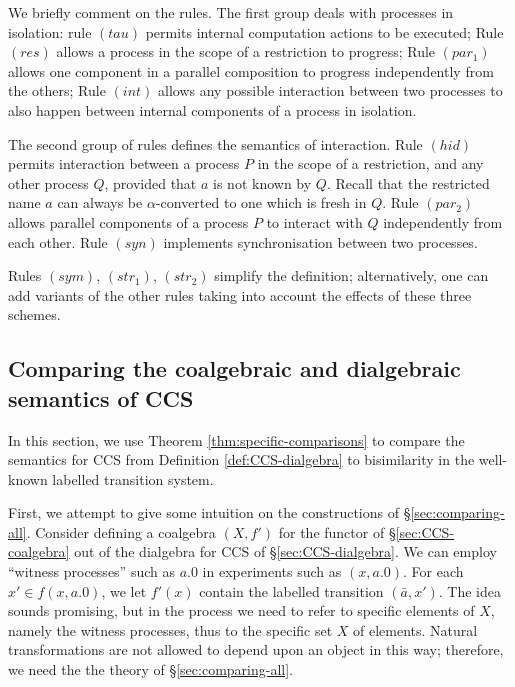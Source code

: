 \documentclass[orivec]{llncs}
\begin{document}
We briefly comment on the rules. The first group deals with processes in isolation: rule $(tau)$ permits internal computation actions to be executed; Rule $(res)$ allows a process in the scope of a restriction to progress; Rule $(par_1)$ allows one component in a parallel composition to progress independently from the others;  Rule $(int)$ allows any possible interaction between two processes to also happen between internal components of a process in isolation.

The second group of rules defines the semantics of interaction. Rule $(hid)$ permits interaction between a process $P$ in the scope of a restriction, and any other process $Q$, provided that $a$ is not known by $Q$. Recall that the restricted name $a$ can always be $\alpha$-converted to one which is fresh in $Q$. Rule $(par_2)$ allows parallel components of a process $P$ to interact with $Q$ independently from each other. Rule $(syn)$ implements synchronisation between two processes.

Rules $(sym)$, $(str_1)$, $(str_2)$ simplify the definition; alternatively, one can add variants of the other rules taking into account the effects of these three schemes.





\subsection{Comparing the coalgebraic and dialgebraic semantics of CCS}
\label{sec:ccs-comparison}

In this section, we use Theorem \ref{thm:specific-comparisons} to compare the semantics for CCS from Definition \ref{def:CCS-dialgebra} to bisimilarity in the well-known labelled transition system. 

First, we attempt to give some intuition on the constructions of \S\ref{sec:comparing-all}. Consider defining a coalgebra $(X,f')$ for the functor of \S \ref{sec:CCS-coalgebra} out of the dialgebra for CCS of \S \ref{sec:CCS-dialgebra}. We can employ ``witness processes'' such as $a.0$ in experiments such as $(x,a.0)$. For each  $x' \in f(x,a.0)$, we let $f'(x)$ contain the labelled transition $(\bar a,x')$. The idea sounds promising, but in the process we need to refer to specific elements of $X$, namely the witness processes, thus to the specific set $X$ of elements. Natural transformations are not allowed to depend upon an object in this way; therefore, we need the the theory of \S \ref{sec:comparing-all}.
\end{document}
